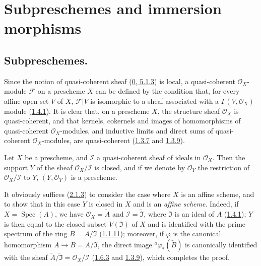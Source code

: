 \section{Subpreschemes and immersion morphisms}
\label{section:I.4}

\subsection{Subpreschemes.}
\label{subsection:I.4.1}

\begin{env}[4.1.1]
\label{I.4.1.1}
Since the notion of quasi-coherent sheaf
(\hyperref[0.5.1.3]{0, 5.1.3}) is local, a
quasi-coherent $\mathscr{O}_X$-module $\mathscr{F}$ on a prescheme $X$ can
be defined by the condition that, for every affine open set $V$ of $X$,
$\mathscr{F}|V$ is isomorphic to a sheaf associated with a
$\Gamma(V,\mathscr{O}_X)$-module (\hyperref[I.1.4.1]{1.4.1}). It is clear
that, on a prescheme $X$, the structure sheaf $\mathscr{O}_X$ is
quasi-coherent, and that kernels, cokernels and images of homomorphisms of
quasi-coherent $\mathscr{O}_X$-modules, and inductive limits and direct sums
of quasi-coherent $\mathscr{O}_X$-modules, are quasi-coherent
(\hyperref[I.1.3.7]{1.3.7} and \hyperref[I.1.3.9]{1.3.9}).
\end{env}

\begin{proposition}[4.1.2]
\label{I.4.1.2}
Let $X$ be a prescheme, and $\mathscr{I}$ a quasi-coherent sheaf of ideals
in $\mathscr{O}_X$. Then the support $Y$ of the sheaf
$\mathscr{O}_X/\mathscr{I}$ is closed, and if we denote by
$\mathscr{O}_Y$ the restriction of $\mathscr{O}_X/\mathscr{I}$ to $Y$,
$(Y,\mathscr{O}_Y)$ is a prescheme.
\end{proposition}

It obviously suffices (\hyperref[I.2.1.3]{2.1.3}) to consider the case where
$X$ is an affine scheme, and to show that in this case $Y$ is closed in
$X$ and is an \emph{affine scheme}. Indeed, if
$X=\operatorname{Spec}(A)$, we have $\mathscr{O}_X=\widetilde{A}$ and
$\mathscr{I}=\widetilde{\mathfrak{I}}$, where $\mathfrak{I}$ is an ideal of
$A$ (\hyperref[I.1.4.1]{1.4.1}); $Y$ is then equal to the closed subset
$V(\mathfrak{I})$ of $X$ and is identified with the prime spectrum of the ring
$B=A/\mathfrak{I}$ (\hyperref[I.1.1.11]{1.1.11}); moreover, if $\varphi$
is the canonical homomorphism $A\to B=A/\mathfrak{I}$, the direct image
${}^a\varphi_*(\widetilde{B})$ is canonically identified with the sheaf
$\widetilde{A}/\widetilde{\mathfrak{I}}=\mathscr{O}_X/\mathscr{I}$
(\hyperref[I.1.6.3]{1.6.3} and \hyperref[I.1.3.9]{1.3.9}), which completes
the proof.


